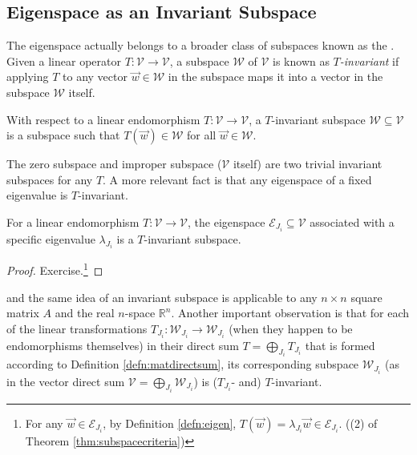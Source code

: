 \subsection{Eigenspace as an Invariant Subspace}
The eigenspace actually belongs to a broader class of subspaces known as the . Given a linear operator $T:\mathcal{V} \to \mathcal{V}$, a subspace $\mathcal{W}$ of $\mathcal{V}$ is known as \textit{$T$-invariant} if applying $T$ to any vector $\vec{w} \in \mathcal{W}$ in the subspace maps it into a vector in the subspace $\mathcal{W}$ itself.
\begin{defn}
With respect to a linear endomorphism $T:\mathcal{V} \to \mathcal{V}$, a $T$-invariant subspace $\mathcal{W} \subseteq \mathcal{V}$ is a subspace such that $T(\vec{w}) \in \mathcal{W}$ for all $\vec{w} \in \mathcal{W}$.
\end{defn}
The zero subspace and improper subspace ($\mathcal{V}$ itself) are two trivial invariant subspaces for any $T$. A more relevant fact is that any eigenspace of a fixed eigenvalue is $T$-invariant.
\begin{proper}
\label{proper:eigenTinvariant}
For a linear endomorphism $T:\mathcal{V} \to \mathcal{V}$, the eigenspace $\mathcal{E}_{J_i} \subseteq \mathcal{V}$ associated with a specific eigenvalue $\lambda_{J_i}$ is a $T$-invariant subspace.
\end{proper}
\begin{proof}
Exercise.\footnote{For any $\vec{w} \in \mathcal{E}_{J_i}$, by Definition \ref{defn:eigen}, $T(\vec{w}) = \lambda_{J_i} \vec{w} \in \mathcal{E}_{J_i}$. ((2) of Theorem \ref{thm:subspacecriteria})}
\end{proof}
and the same idea of an invariant subspace is applicable to any $n \times n$ square matrix $A$ and the real $n$-space $\mathbb{R}^n$. Another important observation is that for each of the linear transformations $T_{J_i}: \mathcal{W}_{J_i} \to \mathcal{W}_{J_i}$ (when they happen to be endomorphisms themselves) in their direct sum $T = \bigoplus_{J_i} T_{J_i}$ that is formed according to Definition \ref{defn:matdirectsum}, its corresponding subspace $\mathcal{W}_{J_i}$ (as in the vector direct sum $\mathcal{V} = \bigoplus_{J_i} \mathcal{W}_{J_i}$) is ($T_{J_i}$- and) $T$-invariant.

